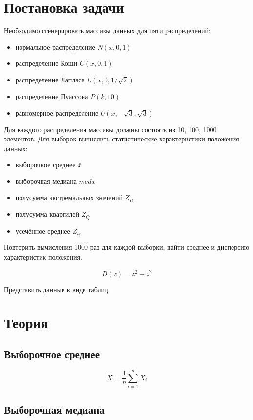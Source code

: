 \section{Постановка задачи}
Необходимо сгенерировать массивы данных для пяти распределений:
\begin{itemize}
\item нормальное распределение \( N(x, 0, 1) \)
\item распределение Коши \( C(x, 0, 1) \)
\item распределение Лапласа \( L(x, 0, 1/\sqrt{2}) \)
\item распределение Пуассона \( P(k, 10) \)
\item равномерное распределение \( U(x, -\sqrt{3}, \sqrt{3}) \)
\end{itemize}
Для каждого распределения массивы должны состоять из 10, 100, 1000 элементов. Для выборок вычислить статистические характеристики положения данных:
\begin{itemize}
\item выборочное среднее \( \bar{x} \)
\item выборочная медиана \( med x \)
\item полусумма экстремальных значений \( Z_{R} \)
\item полусумма квартилей \( Z_{Q} \)
\item усечённое среднее \( Z_{tr}\)
\end{itemize}

Повторить вычисления 1000 раз для каждой выборки, найти среднее и дисперсию характеристик положения. 

\begin{equation}
D(z) = \bar{z^2} - {\bar{z}}^2
\end{equation}

Представить данные в виде таблиц.



\section{Теория}
\subsection{Выборочное среднее}

\begin{equation}
\bar{X} = \frac{1}{n} \sum\limits_{i=1}^n X_i
\end{equation}


\subsection{Выборочная медиана}

